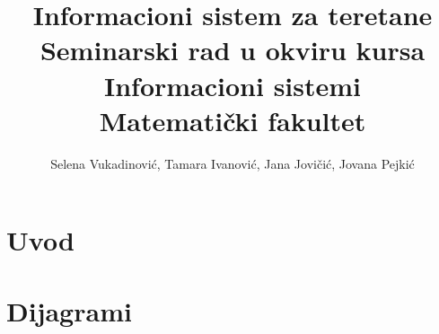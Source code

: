 \documentclass[a4paper]{article}
\begin{document}
\title{Informacioni sistem za teretane\\ \small{Seminarski rad u okviru kursa\\Informacioni sistemi\\ Matematički fakultet}}

\author{Selena Vukadinović, Tamara Ivanović, Jana Jovičić, Jovana Pejkić}


\maketitle
\newpage

\tableofcontents
\newpage

\section{Uvod}
\label{sec:uvod}


\newpage
\section{Dijagrami}


    
\end{document}
